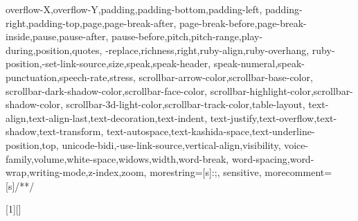 {{    overflow-X,overflow-Y,padding,padding-bottom,padding-left,
    padding-right,padding-top,page,page-break-after,
    page-break-before,page-break-inside,pause,pause-after,
    pause-before,pitch,pitch-range,play-during,position,quotes,
    -replace,richness,right,ruby-align,ruby-overhang,
    ruby-position,-set-link-source,size,speak,speak-header,
    speak-numeral,speak-punctuation,speech-rate,stress,
    scrollbar-arrow-color,scrollbar-base-color,
    scrollbar-dark-shadow-color,scrollbar-face-color,
    scrollbar-highlight-color,scrollbar-shadow-color,
    scrollbar-3d-light-color,scrollbar-track-color,table-layout,
    text-align,text-align-last,text-decoration,text-indent,
    text-justify,text-overflow,text-shadow,text-transform,
    text-autospace,text-kashida-space,text-underline-position,top,
    unicode-bidi,-use-link-source,vertical-align,visibility,
    voice-family,volume,white-space,widows,width,word-break,
    word-spacing,word-wrap,writing-mode,z-index,zoom},
  morestring=[s]{:}{;},
  sensitive,
  morecomment=[s]{/*}{*/}
}



 {}
 {}
 
 {}
 {}



[1][]
  {}
  {}
  
